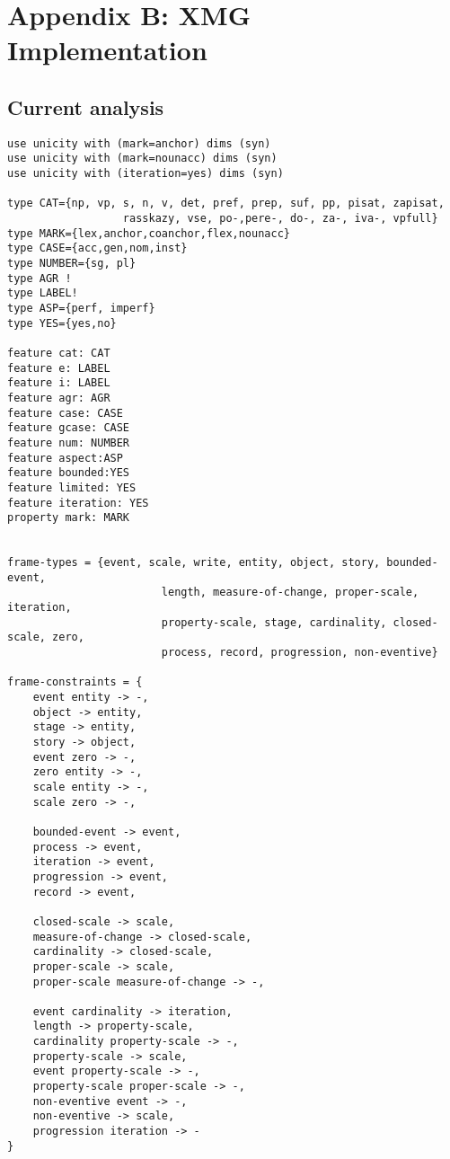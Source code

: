 
\chapter{Appendix B: XMG Implementation}
\label{AppendixB}
\section{Current analysis}\label{B:me}
\begin{lstlisting}[style=AppendixStyle]
use unicity with (mark=anchor) dims (syn)
use unicity with (mark=nounacc) dims (syn)
use unicity with (iteration=yes) dims (syn)

type CAT={np, vp, s, n, v, det, pref, prep, suf, pp, pisat, zapisat,
				  rasskazy, vse, po-,pere-, do-, za-, iva-, vpfull}
type MARK={lex,anchor,coanchor,flex,nounacc}
type CASE={acc,gen,nom,inst}
type NUMBER={sg, pl}
type AGR !
type LABEL!
type ASP={perf, imperf}
type YES={yes,no}

feature cat: CAT
feature e: LABEL
feature i: LABEL
feature agr: AGR
feature case: CASE
feature gcase: CASE
feature num: NUMBER
feature aspect:ASP
feature bounded:YES
feature limited: YES
feature iteration: YES
property mark: MARK


frame-types = {event, scale, write, entity, object, story, bounded-event,
     					length, measure-of-change, proper-scale, iteration, 
     					property-scale, stage, cardinality, closed-scale, zero, 
     					process, record, progression, non-eventive}
    
frame-constraints = {
    event entity -> -,
    object -> entity,
    stage -> entity,
    story -> object,
    event zero -> -,
    zero entity -> -,
    scale entity -> -,
    scale zero -> -,

    bounded-event -> event,
    process -> event,
    iteration -> event,
    progression -> event,
    record -> event,

    closed-scale -> scale,
    measure-of-change -> closed-scale,
    cardinality -> closed-scale,
    proper-scale -> scale,
    proper-scale measure-of-change -> -,
    
    event cardinality -> iteration,
    length -> property-scale,
    cardinality property-scale -> -,
    property-scale -> scale,
    event property-scale -> -,
    property-scale proper-scale -> -,
    non-eventive event -> -,
    non-eventive -> scale,
    progression iteration -> -  
}


\end{lstlisting}
